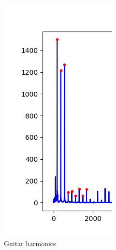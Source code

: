 \documentclass{article}
\begin{document}
\begin{figure}[!htbp]
  \includegraphics[width=\linewidth]{guitar-harmonics-cropped.png}
  \caption{Guitar harmonics}\label{fig:b3}
\endminipage
\end{figure}
\end{document}
